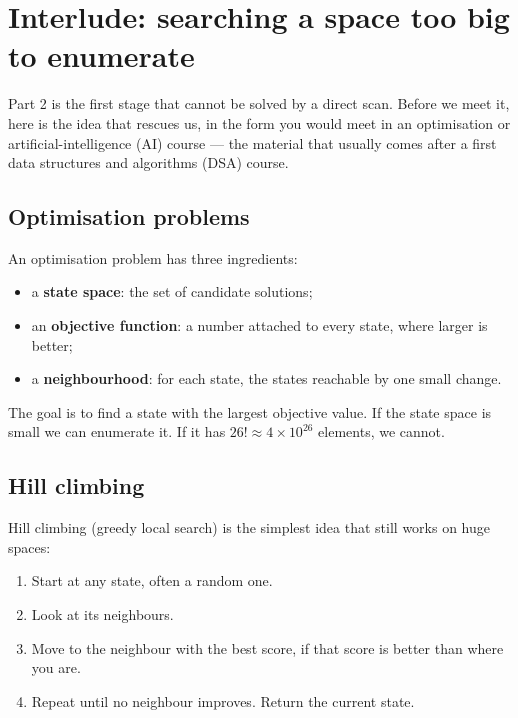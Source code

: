 \documentclass[11pt]{article}
\begin{document}
\section{Interlude: searching a space too big to enumerate}\label{sec:hill}

Part 2 is the first stage that cannot be solved by a direct scan.  Before we
meet it, here is the idea that rescues us, in the form you would meet in an
optimisation or artificial-intelligence (AI) course --- the material that
usually comes after a first data structures and algorithms (DSA) course.

\subsection{Optimisation problems}

An optimisation problem has three ingredients:

\begin{itemize}
  \item a \textbf{state space}: the set of candidate solutions;
  \item an \textbf{objective function}: a number attached to every state,
        where larger is better;
  \item a \textbf{neighbourhood}: for each state, the states reachable by one
        small change.
\end{itemize}

The goal is to find a state with the largest objective value.  If the state
space is small we can enumerate it.  If it has $26!\approx4\times10^{26}$
elements, we cannot.

\subsection{Hill climbing}

Hill climbing (greedy local search) is the simplest idea that still works on
huge spaces:

\begin{enumerate}[label=\arabic*.]
  \item Start at any state, often a random one.
  \item Look at its neighbours.
  \item Move to the neighbour with the best score, if that score is better
        than where you are.
  \item Repeat until no neighbour improves.  Return the current state.
\end{enumerate}
\end{document}
